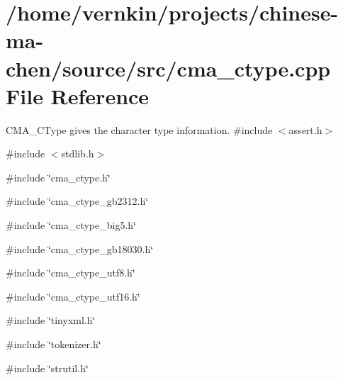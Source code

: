 \section{/home/vernkin/projects/chinese-\/ma-\/chen/source/src/cma\_\-ctype.cpp File Reference}
\label{cma__ctype_8cpp}


CMA\_\-CType gives the character type information.  
{\ttfamily \#include $<$assert.h$>$}\par
{\ttfamily \#include $<$stdlib.h$>$}\par
{\ttfamily \#include \char`\"{}cma\_\-ctype.h\char`\"{}}\par
{\ttfamily \#include \char`\"{}cma\_\-ctype\_\-gb2312.h\char`\"{}}\par
{\ttfamily \#include \char`\"{}cma\_\-ctype\_\-big5.h\char`\"{}}\par
{\ttfamily \#include \char`\"{}cma\_\-ctype\_\-gb18030.h\char`\"{}}\par
{\ttfamily \#include \char`\"{}cma\_\-ctype\_\-utf8.h\char`\"{}}\par
{\ttfamily \#include \char`\"{}cma\_\-ctype\_\-utf16.h\char`\"{}}\par
{\ttfamily \#include \char`\"{}tinyxml.h\char`\"{}}\par
{\ttfamily \#include \char`\"{}tokenizer.h\char`\"{}}\par
{\ttfamily \#include \char`\"{}strutil.h\char`\"{}}\par
